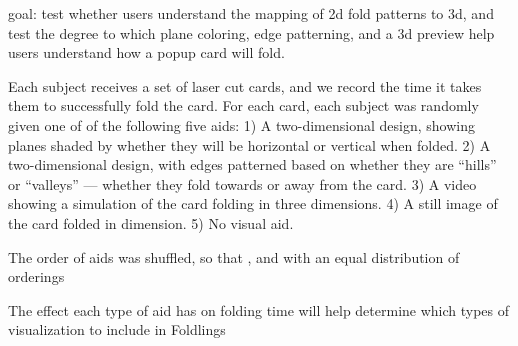 goal: test whether users understand the mapping of 2d fold patterns to
3d, and test the degree to which plane coloring, edge patterning, and a
3d preview help users understand how a popup card will fold.

Each subject receives a set of laser cut cards, and we record the time
it takes them to successfully fold the card. For each card, each subject
was randomly given one of of the following five aids: 1) A
two-dimensional design, showing planes shaded by whether they will be
horizontal or vertical when folded. 2) A two-dimensional design, with
edges patterned based on whether they are ``hills'' or ``valleys'' ---
whether they fold towards or away from the card. 3) A video showing a
simulation of the card folding in three dimensions. 4) A still image of
the card folded in dimension. 5) No visual aid.

The order of aids was shuffled, so that , and with an equal distribution
of orderings

The effect each type of aid has on folding time will help determine
which types of visualization to include in Foldlings
